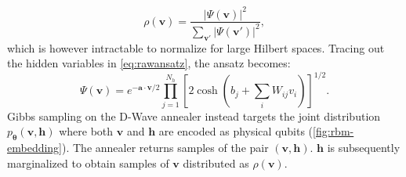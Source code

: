 \documentclass[10pt,a4paper]{article}
\numberwithin{equation}{section}
\begin{document}
\begin{equation}
\rho(\mathbf{v})=\frac{|\Psi(\mathbf{v})|^2}{\sum_{\mathbf{v}'}|\Psi(\mathbf{v}')|^2},
\end{equation}
which is however intractable to normalize for large Hilbert spaces.
Tracing out the hidden variables in \autoref{eq:rawansatz}, the ansatz becomes\cite{Carleo_2017}:
\begin{equation}
\label{eq:ansatz}
\Psi(\mathbf{v}) = e^{-\mathbf{a} \cdot \mathbf{v}/2} \prod_{j=1}^{N_h} \left[ 2\cosh\!\left(b_j + \sum_i W_{ij} v_i\right) \right]^{1/2}.
\end{equation}
Gibbs sampling on the D-Wave annealer instead targets the joint distribution $p_{\boldsymbol\theta}(\mathbf{v},\mathbf{h})$ where both $\mathbf{v}$ and $\mathbf{h}$ are encoded as physical qubits (\autoref{fig:rbm-embedding}). The annealer returns samples of the pair $(\mathbf{v},\mathbf{h})$. $\mathbf{h}$ is subsequently marginalized to obtain samples of $\mathbf{v}$ distributed as $\rho(\mathbf{v})$.
\end{document}
